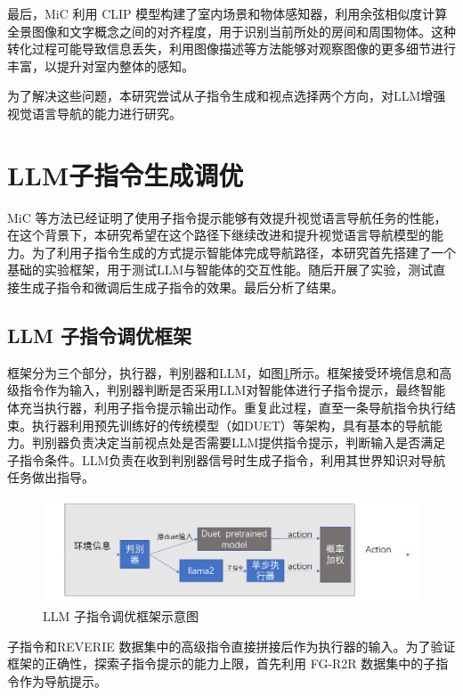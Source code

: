 \documentclass[bachelor]{thesis-uestc}
\begin{document}
最后，MiC 利用 CLIP 模型构建了室内场景和物体感知器，利用余弦相似度计算全景图像和文字概念之间的对齐程度，用于识别当前所处的房间和周围物体。这种转化过程可能导致信息丢失，利用图像描述等方法能够对观察图像的更多细节进行丰富，以提升对室内整体的感知。

为了解决这些问题，本研究尝试从子指令生成和视点选择两个方向，对LLM增强视觉语言导航的能力进行研究。

\section{LLM子指令生成调优}

MiC 等方法已经证明了使用子指令提示能够有效提升视觉语言导航任务的性能，在这个背景下，本研究希望在这个路径下继续改进和提升视觉语言导航模型的能力。为了利用子指令生成的方式提示智能体完成导航路径，本研究首先搭建了一个基础的实验框架，用于测试LLM与智能体的交互性能。随后开展了实验，测试直接生成子指令和微调后生成子指令的效果。最后分析了结果。

\subsection{LLM 子指令调优框架}

框架分为三个部分，执行器，判别器和LLM，如图\ref{ft}所示。框架接受环境信息和高级指令作为输入，判别器判断是否采用LLM对智能体进行子指令提示，最终智能体充当执行器，利用子指令提示输出动作。重复此过程，直至一条导航指令执行结束。执行器利用预先训练好的传统模型（如DUET）等架构，具有基本的导航能力。判别器负责决定当前视点处是否需要LLM提供指令提示，判断输入是否满足子指令条件。LLM负责在收到判别器信号时生成子指令，利用其世界知识对导航任务做出指导。

\begin {figure}[h]
\centering %
\includegraphics[width=\textwidth]{1932-042816.png}
\caption{LLM 子指令调优框架示意图} %
\label{ft}
\end {figure}

子指令和REVERIE 数据集中的高级指令直接拼接后作为执行器的输入。为了验证框架的正确性，探索子指令提示的能力上限，首先利用 FG-R2R 数据集中的子指令作为导航提示。
\end{document}
